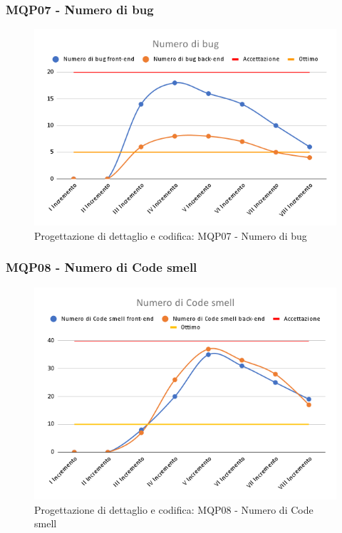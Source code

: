 \subsubsection{MQP07 - Numero di bug}
\begin{figure}[H]
    \centering
    \includegraphics[scale=0.50]{Sezioni/images/pb_prodotto/Numero_di_bug.png}
    \caption{Progettazione di dettaglio e codifica: MQP07 - Numero di bug}
\end{figure}
\subsubsection{MQP08 - Numero di Code smell}
\begin{figure}[H]
    \centering
    \includegraphics[scale=0.50]{Sezioni/images/pb_prodotto/Numero_di_Code_smell.png}
    \caption{Progettazione di dettaglio e codifica: MQP08 - Numero di Code smell}
\end{figure}
